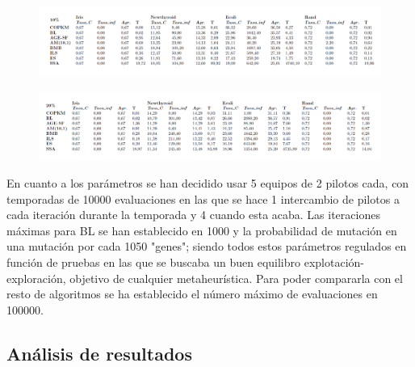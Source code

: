 \documentclass{article}
\begin{document}
	\begin{figure}[H]
		\includegraphics[width=\linewidth]{imagenes/tabla10.png}
		\label{fig:boat1}
	\end{figure}

	\begin{figure}[H]
		\includegraphics[width=\linewidth]{imagenes/tabla20.png}
		\label{fig:boat2}
	\end{figure}

	En cuanto a los parámetros se han decidido usar 5 equipos de 2 pilotos cada, con temporadas de 10000 evaluaciones en las que se hace 1 intercambio de pilotos a cada iteración durante la temporada y 4 cuando esta acaba. Las iteraciones máximas para BL se han establecido en 1000 y la probabilidad de mutación en una mutación por cada 1050 "genes"; siendo todos estos parámetros regulados en función de pruebas en las que se buscaba un buen equilibro explotación-exploración, objetivo de cualquier metaheurística. Para poder compararla con el resto de algoritmos se ha establecido el número máximo de evaluaciones en 100000.

	\subsection{Análisis de resultados}
	
\end{document}
